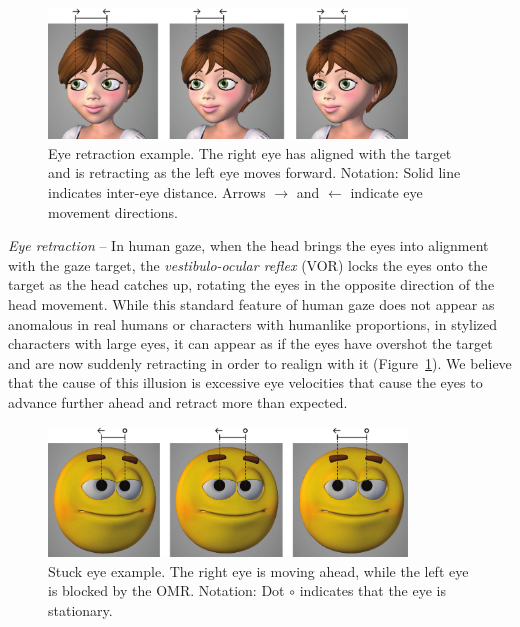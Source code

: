 \begin{figure}
\centering
\includegraphics[width=0.85\textwidth]{stylizedgaze/Figures/EyeRetractionExample-small.pdf}
\caption{Eye retraction example. The right eye has aligned with the target and is retracting as the left eye moves forward. Notation: Solid line indicates inter-eye distance. Arrows $\rightarrow$ and $\leftarrow$ indicate eye movement directions.}
\label{fig:EyeRetractionExample}
\end{figure}

\noindent\emph{Eye retraction} -- In human gaze, when the head brings the eyes into alignment with the gaze target, the \textit{vestibulo-ocular reflex} (VOR) locks the eyes onto the target as the head catches up, rotating the eyes in the opposite direction of the head movement. While this standard feature of human gaze does not appear as anomalous in real humans or characters with humanlike proportions, in stylized characters with large eyes, it can appear as if the eyes have overshot the target and are now suddenly retracting in order to realign with it (Figure~\ref{fig:EyeRetractionExample}). We believe that the cause of this illusion is excessive eye velocities that cause the eyes to advance further ahead and retract more than expected.

\begin{figure}
\centering
\includegraphics[width=0.85\textwidth]{stylizedgaze/Figures/StuckEyeExample-small.pdf}
\caption{Stuck eye example. The right eye is moving ahead, while the left eye is blocked by the OMR. Notation: Dot $\circ$ indicates that the eye is stationary.}
\label{fig:StuckEyeExample}
\end{figure}

